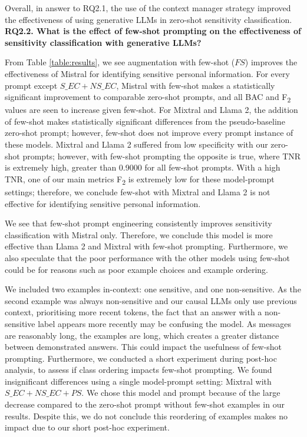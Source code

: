 Overall, in answer to RQ2.1, the use of the context manager strategy improved the effectiveness of using generative LLMs in zero-shot sensitivity classification. \\

\textbf{RQ2.2. What is the effect of few-shot prompting on the effectiveness of sensitivity classification with generative LLMs?}

From Table \ref{table:results}, we see augmentation with few-shot ($FS$) improves the effectiveness of Mistral for identifying sensitive personal information. For every prompt except $S\_EC+NS\_EC$, Mistral with few-shot makes a statistically significant improvement to comparable zero-shot prompts, and all BAC and F\textsubscript{2} values are seen to increase given few-shot. For Mixtral and Llama 2, the addition of few-shot makes statistically significant differences from the pseudo-baseline zero-shot prompt; however, few-shot does not improve every prompt instance of these models. Mixtral and Llama 2 suffered from low specificity with our zero-shot prompts; however, with few-shot prompting the opposite is true, where TNR is extremely high, greater than 0.9000 for all few-shot prompts. With a high TNR, one of our main metrics F\textsubscript{2} is extremely low for these model-prompt settings; therefore, we conclude few-shot with Mixtral and Llama 2 is not effective for identifying sensitive personal information.

We see that few-shot prompt engineering consistently improves sensitivity classification with Mistral only. Therefore, we conclude this model is more effective than Llama 2 and Mixtral with few-shot prompting. Furthermore, we also speculate that the poor performance with the other models using few-shot could be for reasons such as poor example choices and example ordering.

We included two examples in-context: one sensitive, and one non-sensitive. As the second example was always non-sensitive and our causal LLMs only use previous context, prioritising more recent tokens, the fact that an answer with a non-sensitive label appears more recently may be confusing the model. As messages are reasonably long, the examples are long, which creates a greater distance between demonstrated answers. This could impact the usefulness of few-shot prompting. Furthermore, we conducted a short experiment during post-hoc analysis, to assess if class ordering impacts few-shot prompting. We found insignificant differences using a single model-prompt setting: Mixtral with $S\_EC+NS\_EC+PS$. We chose this model and prompt because of the large decrease compared to the zero-shot prompt without few-shot examples in our results. Despite this, we do not conclude this reordering of examples makes no impact due to our short post-hoc experiment.

